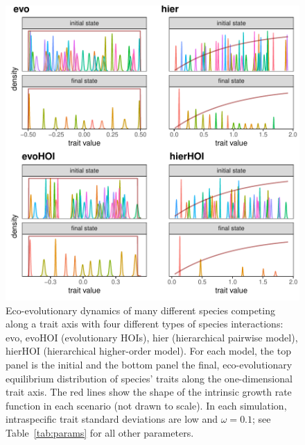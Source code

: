 \documentclass[11pt]{article}
\begin{document}
\begin{figure}[p]
  \centering
  \includegraphics[width=\textwidth]{examples.pdf}
  \caption{Eco-evolutionary dynamics of many different species competing along a trait axis with four different types of species interactions: evo, evoHOI (evolutionary HOIs), hier (hierarchical pairwise model), hierHOI (hierarchical higher-order model). For each model, the top panel is the initial and the bottom panel the final, eco-evolutionary equilibrium distribution of species' traits along the one-dimensional trait axis. The red lines show the shape of the intrinsic growth rate function in each scenario (not drawn to scale). In each simulation, intraspecific trait standard deviations are low and $\omega = 0.1$; see Table~\ref{tab:params} for all other parameters.}
  \label{fig:examples}
\end{figure}
\end{document}
